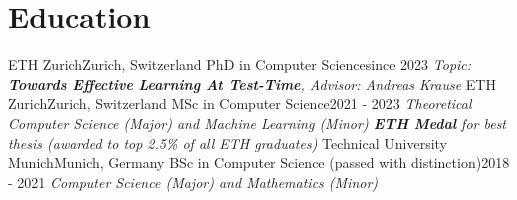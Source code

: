 \documentclass[a4paper,20pt]{article}
\begin{document}
\section{Education}
  \resumeSubHeadingListStart
    \resumeSubheading
      {ETH Zurich}{Zurich, Switzerland}
      {PhD in Computer Science}{since 2023}
      {\scriptsize \textit{ \footnotesize{\newline Topic: \textbf{Towards Effective Learning At Test-Time}, Advisor: Andreas Krause}}}
    \resumeSubHeadingListEnd
  \vspace{-10pt}
    \resumeSubHeadingListStart
      \resumeSubheading
        {ETH Zurich}{Zurich, Switzerland}
        {MSc in Computer Science}{2021 - 2023}
        {\scriptsize \textit{ \footnotesize{\newline{}Theoretical Computer Science (Major) and Machine Learning (Minor)}
        \newline \textbf{ETH Medal} for best thesis (awarded to top 2.5\% of all ETH graduates)}}
      \resumeSubHeadingListEnd
  \vspace{-10pt}
    \resumeSubHeadingListStart
      \resumeSubheading
        {Technical University Munich}{Munich, Germany}
        {BSc in Computer Science (passed with distinction)}{2018 - 2021}
        {\scriptsize \textit{ \footnotesize{\newline{}Computer Science (Major) and Mathematics (Minor)}}}
      \resumeSubHeadingListEnd
\end{document}
